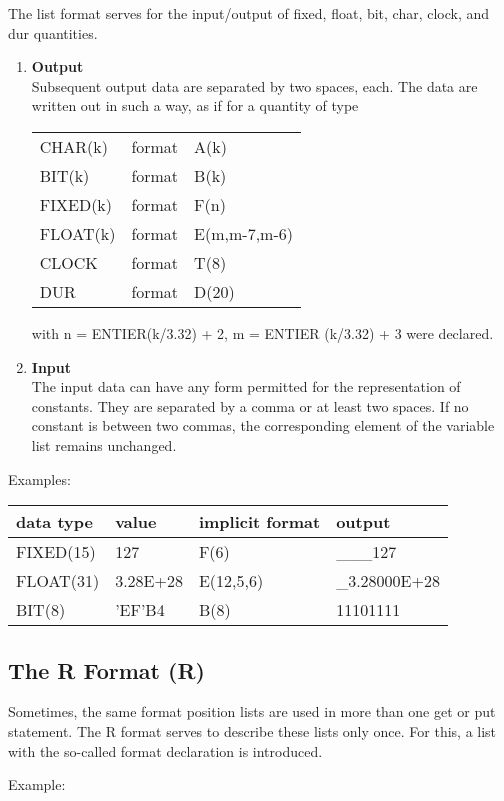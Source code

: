 The list format serves for the input/output of fixed, float, bit, char,
clock, and dur quantities.
\begin{enumerate}
\item {\bf Output}\\
Subsequent output data are separated by two spaces, each. The data are
written out in such a way, as if for a quantity of type

\begin{tabular}{lll}
CHAR(k)  & format & A(k)\\
BIT(k)   & format & B(k)\\
FIXED(k) & format & F(n)\\
FLOAT(k) & format & E(m,m-7,m-6)\\
CLOCK    & format & T(8)\\
DUR      & format & D(20)
\end{tabular}

with n = ENTIER(k/3.32) + 2, m = ENTIER (k/3.32) + 3 were
declared.
\item {\bf Input}\\
The input data can have any form permitted for the representation of
constants. They are separated by a comma or at least two spaces. If no
constant is between two commas, the corresponding element of the
variable list remains unchanged.
\end{enumerate}

Examples:

\begin{tabular}{llll}
data type & value    & implicit format & output \\ \hline
FIXED(15) & 127      & F(6)            & \_\_\_127 \\
FLOAT(31) & 3.28E+28 & E(12,5,6)       & \_3.28000E+28\\
BIT(8)    & 'EF'B4   & B(8)            & 11101111
\end{tabular}

\subsection{The R Format (R)}   %
\label{sec_dation_r_format}

Sometimes, the same format position lists are used in more than one get
or put statement. The R format serves to describe these lists only
once. For this, a list with the so-called format declaration is
introduced.



Example:

